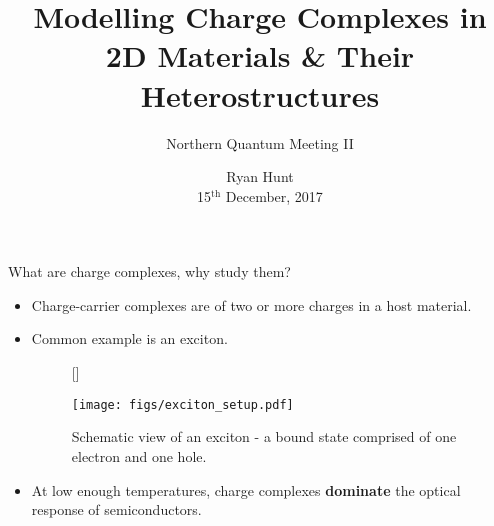 \documentclass[12pt, pdf, hyperref={draft}, usenames, dvipsnames]{beamer}
\title{Modelling Charge Complexes in \\
       2D Materials \& Their Heterostructures}
\subtitle{Northern Quantum Meeting II}
\author{Ryan Hunt \\
15$^{\text{th}}$ December, 2017}
\date{}
\newcommand{\blue}[1]{{\bf\color{NavyBlue}{#1}}}
\begin{document}
\begin{frame}[plain]
  \titlepage\end{frame}







\begin{frame}{What are charge complexes, why study them?}

\begin{itemize}
  \item Charge-carrier complexes are \blue{bound states} of two or more charges in a host
  material.
  \item Common example is an exciton.

  \begin{figure}[H]
    [\FBwidth]
    {\caption{Schematic view of an exciton - a bound state comprised of one
    electron and one hole.}\label{fig:exc_schematic}}
    {\texttt{[image: figs/exciton\_setup.pdf]}}
  \end{figure}

  \item At low enough temperatures, charge complexes {\bf dominate} the optical
  response of semiconductors.

\end{itemize}

\end{frame}
\end{document}

